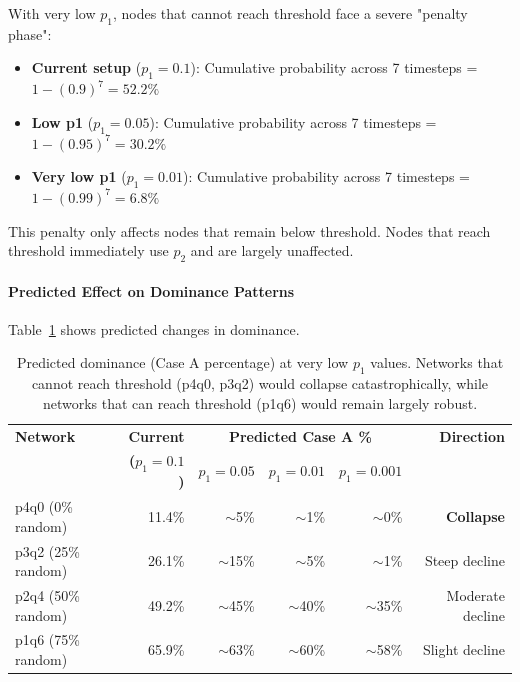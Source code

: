 \documentclass[12pt,a4paper]{article}
\begin{document}
With very low $p_1$, nodes that cannot reach threshold face a severe "penalty phase":
\begin{itemize}
    \item \textbf{Current setup} ($p_1 = 0.1$): Cumulative probability across 7 timesteps = $1 - (0.9)^7 = 52.2\%$
    \item \textbf{Low p1} ($p_1 = 0.05$): Cumulative probability across 7 timesteps = $1 - (0.95)^7 = 30.2\%$
    \item \textbf{Very low p1} ($p_1 = 0.01$): Cumulative probability across 7 timesteps = $1 - (0.99)^7 = 6.8\%$
\end{itemize}

This penalty only affects nodes that remain below threshold. Nodes that reach threshold immediately use $p_2$ and are largely unaffected.

\paragraph{Predicted Effect on Dominance Patterns}

Table~\ref{tab:low_p1_dominance_prediction} shows predicted changes in dominance.

\begin{table}[H]
\centering
\begin{tabular}{@{}lrrrrr@{}}
\toprule
\textbf{Network} & \textbf{Current} & \multicolumn{3}{c}{\textbf{Predicted Case A \%}} & \textbf{Direction} \\
 & \textbf{($p_1=0.1$)} & $p_1=0.05$ & $p_1=0.01$ & $p_1=0.001$ & \\
\midrule
p4q0 (0\% random)  & 11.4\% & $\sim$5\% & $\sim$1\% & $\sim$0\% & \textbf{Collapse} \\
p3q2 (25\% random) & 26.1\% & $\sim$15\% & $\sim$5\% & $\sim$1\% & Steep decline \\
p2q4 (50\% random) & 49.2\% & $\sim$45\% & $\sim$40\% & $\sim$35\% & Moderate decline \\
p1q6 (75\% random) & 65.9\% & $\sim$63\% & $\sim$60\% & $\sim$58\% & Slight decline \\
\bottomrule
\end{tabular}
\caption{Predicted dominance (Case A percentage) at very low $p_1$ values. Networks that cannot reach threshold (p4q0, p3q2) would collapse catastrophically, while networks that can reach threshold (p1q6) would remain largely robust.}
\label{tab:low_p1_dominance_prediction}
\end{table}
\end{document}
